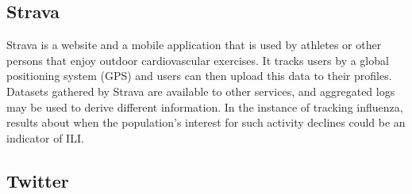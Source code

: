   

\subsection{Strava}
Strava\cite{strava_main} is a website and a mobile application that is used by athletes or other persons that enjoy outdoor cardiovascular exercises. It tracks users by a global positioning system (GPS) and users can then upload this data to their profiles\cite{strata_wiki}. Datasets gathered by Strava are available to other services, and aggregated logs may be used to derive different information. In the instance of tracking influenza, results about when the population's interest for such activity declines could be an indicator of ILI. 





\subsection{Twitter}
